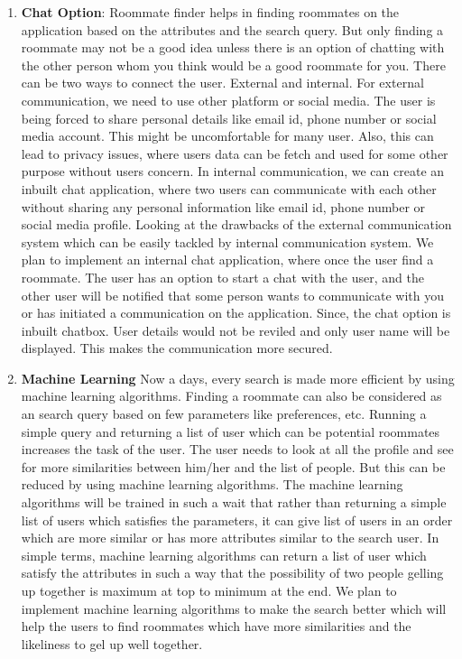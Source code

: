 \documentclass{sig-alternate-05-2015}
\begin{document}
\begin{enumerate}
\item \textbf{Chat Option}:
Roommate finder helps in finding roommates on the application based on the attributes and the search query. But only finding a roommate may not be a good idea unless there is an option of chatting with the other person whom you think would be a good roommate for you. There can be two ways to connect the user. External and internal. For external communication, we need to use other platform or social media. The user is being forced to share personal details like email id, phone number or social media account. This might be uncomfortable for many user. Also, this can lead to privacy issues, where users data can be fetch and used for some other purpose without users concern. In internal communication, we can create an inbuilt chat application, where two users can communicate with each other without sharing any personal information like email id, phone number or social media profile. Looking at the drawbacks of the external communication system which can be easily tackled by internal communication system. We plan to implement an internal chat application, where once the user find a roommate. The user has an option to start a chat with the user, and the other user will be notified that some person wants to communicate with you or has initiated a communication on the application. Since, the chat option is inbuilt chatbox. User details would not be reviled and only user name will be displayed. This makes the communication more secured.
\item \textbf{Machine Learning}
Now a days, every search is made more efficient by using machine learning algorithms. Finding a roommate can also be considered as an search query based on few parameters like preferences, etc. Running a simple query and returning a list of user which can be potential roommates increases the task of the user. The user needs to look at all the profile and see for more similarities between him/her and the list of people. But this can be reduced by using machine learning algorithms. The machine learning algorithms will be trained in such a wait that rather than returning a simple list of users which satisfies the parameters, it can give list of users in an order which are more similar or has more attributes similar to the search user. In simple terms, machine learning algorithms can return a list of user which satisfy the attributes in such a way that the possibility of two people gelling up together is maximum at top to minimum at the end. We plan to implement machine learning algorithms to make the search better which will help the users to find roommates which have more similarities and the likeliness to gel up well together.

\end{enumerate}
\end{document}
